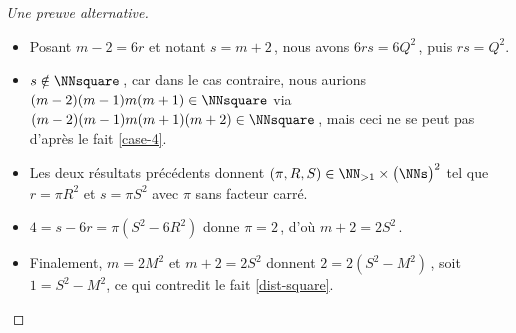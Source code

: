 \begin{proof}[Une preuve alternative]
\begin{itemize}
\begin{itemize}
			\item Posant $m - 2 = 6 r$ et notant $s = m + 2$\,, nous avons $6 r s = 6 Q^2$\,, puis $r s = Q^2$.
			
			\item $s \notin \NNsquare$\,, car dans le cas contraire, nous aurions $(m-2)(m-1)m(m+1) \in \NNsquare$ via $(m-2)(m-1)m(m+1)(m+2)  \in \NNsquare$\,, mais ceci ne se peut pas d'après le fait \ref{case-4}.
			
			\item Les deux résultats précédents donnent $(\pi, R, S) \in \NN_{>1} \times \big( \NNs \big)^2$ tel que $r = \pi R^2$ et $s = \pi S^2$ avec $\pi$ sans facteur carré.
			
			\item $4 = s - 6r = \pi (S^2 - 6 R^2)$ donne $\pi = 2$\,, d'où $m + 2 = 2 S^2$\,.
			
			\item Finalement, $m = 2 M^2$ et $m + 2 = 2 S^2$ donnent $2 = 2(S^2 - M^2)$\,, soit $1 = S^2 - M^2$, ce qui contredit le fait \ref{dist-square}.
			\qedhere
		\end{itemize}
	\end{itemize}
\end{proof}

